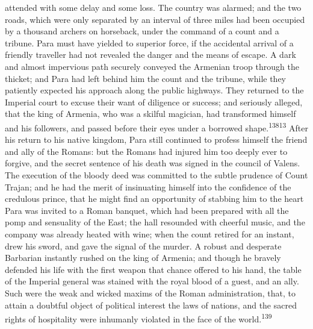 attended with some delay and some loss. The country was alarmed;
and the two roads, which were only separated by an interval of
three miles had been occupied by a thousand archers on horseback,
under the command of a count and a tribune. Para must have
yielded to superior force, if the accidental arrival of a
friendly traveller had not revealed the danger and the means of
escape. A dark and almost impervious path securely conveyed the
Armenian troop through the thicket; and Para had left behind him
the count and the tribune, while they patiently expected his
approach along the public highways. They returned to the Imperial
court to excuse their want of diligence or success; and seriously
alleged, that the king of Armenia, who was a skilful magician,
had transformed himself and his followers, and passed before
their eyes under a borrowed shape.\textsuperscript{13813} After his return to his
native kingdom, Para still continued to profess himself the
friend and ally of the Romans: but the Romans had injured him too
deeply ever to forgive, and the secret sentence of his death was
signed in the council of Valens. The execution of the bloody deed
was committed to the subtle prudence of Count Trajan; and he had
the merit of insinuating himself into the confidence of the
credulous prince, that he might find an opportunity of stabbing
him to the heart Para was invited to a Roman banquet, which had
been prepared with all the pomp and sensuality of the East; the
hall resounded with cheerful music, and the company was already
heated with wine; when the count retired for an instant, drew his
sword, and gave the signal of the murder. A robust and desperate
Barbarian instantly rushed on the king of Armenia; and though he
bravely defended his life with the first weapon that chance
offered to his hand, the table of the Imperial general was
stained with the royal blood of a guest, and an ally. Such were
the weak and wicked maxims of the Roman administration, that, to
attain a doubtful object of political interest the laws of
nations, and the sacred rights of hospitality were inhumanly
violated in the face of the world.\textsuperscript{139}




